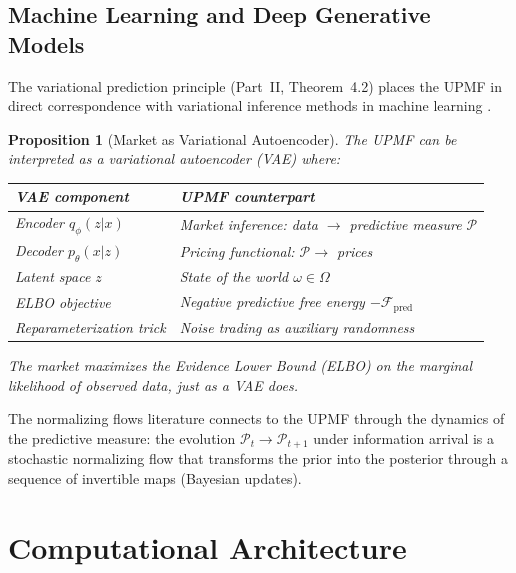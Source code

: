 \documentclass[12pt,a4paper]{article}
\newtheorem{proposition}[theorem]{Proposition}
\theoremstyle{definition}
\newcommand{\PP}{\mathcal{P}}
\begin{document}
\subsection{Machine Learning and Deep Generative Models}\label{sec:lit_ml}

The variational prediction principle (Part~II, Theorem~4.2) places the UPMF in direct correspondence with variational inference methods in machine learning \citep{blei2017}.

\begin{proposition}[Market as Variational Autoencoder]\label{prop:vae}
The UPMF can be interpreted as a variational autoencoder (VAE) where:
\begin{center}
\begin{tabular}{ll}
\toprule
\textbf{VAE component} & \textbf{UPMF counterpart} \\
\midrule
Encoder $q_\phi(z|x)$ & Market inference: data $\to$ predictive measure $\PP$ \\
Decoder $p_\theta(x|z)$ & Pricing functional: $\PP \to$ prices \\
Latent space $z$ & State of the world $\omega \in \Omega$ \\
ELBO objective & Negative predictive free energy $-\mathcal{F}_{\text{pred}}$ \\
Reparameterization trick & Noise trading as auxiliary randomness \\
\bottomrule
\end{tabular}
\end{center}
The market maximizes the Evidence Lower Bound (ELBO) on the marginal likelihood of observed data, just as a VAE does.
\end{proposition}

The normalizing flows literature \citep{rezende2015} connects to the UPMF through the dynamics of the predictive measure: the evolution $\PP_t \to \PP_{t+1}$ under information arrival is a stochastic normalizing flow that transforms the prior into the posterior through a sequence of invertible maps (Bayesian updates).



\section{Computational Architecture}\label{sec:architecture}
\end{document}
